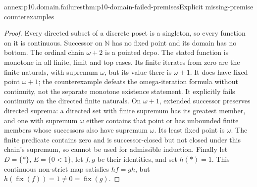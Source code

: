 \begin{annexitem}{annex:p10.domain.failures}{thm:p10-domain-failed-premises}{Explicit missing-premise counterexamples}
\begin{proof}
Every directed subset of a discrete poset is a singleton, so every
function on it is continuous. Successor on \(\mathbb N\) has no
fixed point and its domain has no bottom.
The ordinal chain \(\omega+2\) is a pointed dcpo. The stated
function is monotone in all finite, limit and top cases. Its finite
iterates from zero are the finite naturals, with supremum \(\omega\),
but its value there is \(\omega+1\). It does have fixed point
\(\omega+1\); the counterexample defeats the omega-iteration
formula without continuity, not the separate monotone existence
statement. It explicitly fails continuity on the directed finite
naturals.
On \(\omega+1\), extended successor preserves directed suprema:
a directed set with finite supremum has its greatest member, and
one with supremum \(\omega\) either contains that point or has
unbounded finite members whose successors also have supremum
\(\omega\). Its least fixed point is \(\omega\). The finite
predicate contains zero and is successor-closed but not closed
under this chain's supremum, so cannot be used for admissible
induction.
Finally let \(D=\{*\}\), \(E=\{0<1\}\), let \(f,g\) be
their identities, and set \(h(*)=1\). This continuous non-strict
map satisfies \(hf=gh\), but
\(h(\operatorname{fix}(f))=1\ne0=\operatorname{fix}(g)\).
\end{proof}
\end{annexitem}

